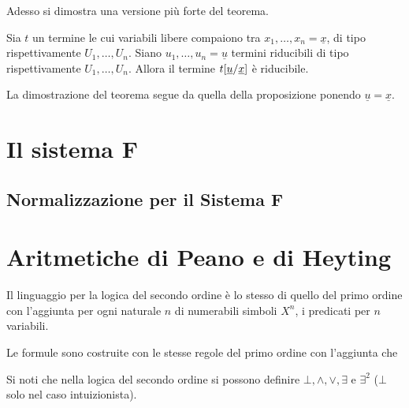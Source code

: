 \documentclass[]{marticle}
\begin{document}
Adesso si dimostra una versione pi\`u forte del teorema.

\begin{block}[Proposizione]
    Sia $t$ un termine le cui variabili libere compaiono tra $x_1, \dots, x_n =
    \underline{x}$, di tipo rispettivamente $U_1, \dots, U_n$. Siano $u_1,
    \dots, u_n = \underline{u}$ termini riducibili di tipo rispettivamente $U_1,
    \dots, U_n$. Allora il termine $t[\underline{u}/\underline{x}]$ \`e
    riducibile.
\end{block}

La dimostrazione del teorema segue da quella della proposizione ponendo
$\underline{u} = \underline{x}$.

\section{Il sistema F}

\subsection{Normalizzazione per il Sistema F}

\section{Aritmetiche di Peano e di Heyting}


\begin{block}[Definizione]
    Il linguaggio per la logica del secondo ordine \`e lo stesso di quello del
    primo ordine con l'aggiunta per ogni naturale $n$ di numerabili simboli
    $X^n$, i predicati per $n$ variabili. 
    
    Le formule sono costruite con le stesse regole del primo ordine con
    l'aggiunta che 
\end{block} 

\begin{block}[Definizione]
\end{block}

Si noti che nella logica del secondo ordine si possono definire $\bot, \land,
\lor, \exists$ e $\exists^2$ ($\bot$ solo nel caso intuizionista).
\end{document}
